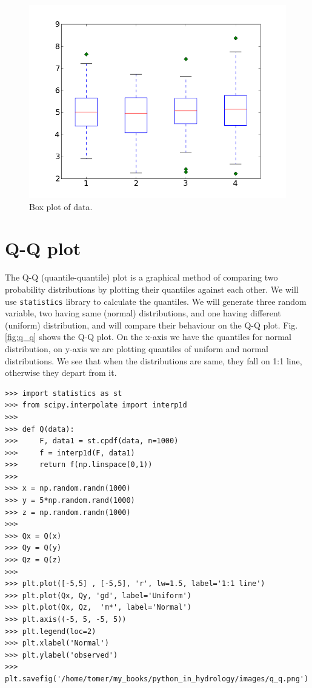 \documentclass[10pt]{book}
\begin{document}
{\beforefig
\begin{figure}[h!]
  \centering
    \includegraphics[scale=0.5]{images/boxplot.png}
  \caption{Box plot of data.}
   \label{fig:boxplot}
\end{figure}
\afterfig

\section{Q-Q plot}
The Q-Q (quantile-quantile) plot is a graphical method of comparing two probability distributions by plotting their quantiles against each other. We will use \verb"statistics" library to calculate the quantiles. We will generate three random variable, two having same (normal) distributions, and one having different (uniform) distribution, and will compare their behaviour on the Q-Q plot. Fig. \ref{fig:q_q} shows the Q-Q plot. On the x-axis we have the quantiles for normal distribution, on y-axis we are plotting quantiles of uniform and normal distributions. We  see that when the distributions are same, they fall on 1:1 line, otherwise they depart from it. 
\beforeverb \begin{verbatim}
>>> import statistics as st
>>> from scipy.interpolate import interp1d
>>> 
>>> def Q(data):
>>>     F, data1 = st.cpdf(data, n=1000)
>>>     f = interp1d(F, data1)
>>>     return f(np.linspace(0,1))
>>> 
>>> x = np.random.randn(1000)
>>> y = 5*np.random.rand(1000)
>>> z = np.random.randn(1000)
>>> 
>>> Qx = Q(x)
>>> Qy = Q(y)
>>> Qz = Q(z)
>>> 
>>> plt.plot([-5,5] , [-5,5], 'r', lw=1.5, label='1:1 line')
>>> plt.plot(Qx, Qy, 'gd', label='Uniform')
>>> plt.plot(Qx, Qz,  'm*', label='Normal')
>>> plt.axis((-5, 5, -5, 5))
>>> plt.legend(loc=2)
>>> plt.xlabel('Normal')
>>> plt.ylabel('observed')
>>> plt.savefig('/home/tomer/my_books/python_in_hydrology/images/q_q.png')
\end{verbatim} \afterverb

}
\end{document}
